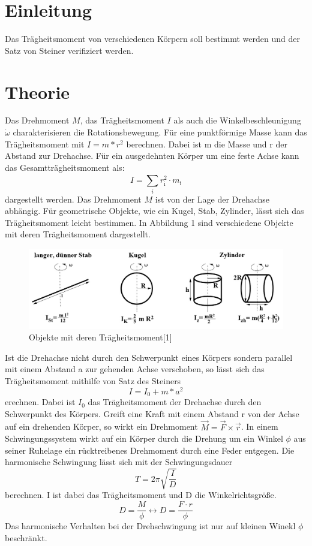 \section{Einleitung}
Das Trägheitsmoment von verschiedenen Körpern soll bestimmt werden und der Satz von Steiner verifiziert werden.
\section{Theorie}
Das Drehmoment $M$, das Trägheitsmoment $I$ als auch die Winkelbeschleunigung $\dot{\omega}$ charakterisieren die Rotationsbewegung.
Für eine punktförmige Masse kann das Trägheitsmoment mit $I = m*r^2$ berechnen. Dabei ist m die Masse und r der Abstand zur Drehachse.
Für ein ausgedehnten Körper um eine feste Achse kann das Gesamtträgheitsmoment als:
\begin{equation}
  I=\sum \limits_{i}^{} r_\text{i}^2 \cdot m_\text{i}
\end{equation}
dargestellt werden.
Das Drehmoment $M$ ist von der Lage der Drehachse abhängig.
Für geometrische Objekte, wie ein Kugel, Stab, Zylinder, lässt sich das Trägheitsmoment
leicht bestimmen.
In Abbildung 1 sind verschiedene Objekte mit deren Trägheitsmoment dargestellt.
\begin{figure}[H]
\centering
\includegraphics[width=\textwidth]{Bild1.jpg}
\caption{Objekte mit deren Trägheitsmoment[1]}
\label{fig:Abb1}
\end{figure}
Ist die Drehachse nicht durch den Schwerpunkt eines Körpers sondern parallel mit einem Abstand a
zur gehenden Achse verschoben, so lässt sich das Trägheitsmoment mithilfe von Satz des Steiners
\begin{equation}
  I = I_\text{0} + m*a^2
\end{equation}
erechnen. Dabei ist $I_\text{0}$ das Trägheitsmoment der Drehachse durch den Schwerpunkt des Körpers.
Greift eine Kraft mit einem Abstand r von der Achse auf ein drehenden Körper, so wirkt ein Drehmoment $\vec{M} = \vec{F} \times \vec{r}$.
In einem Schwingungssystem wirkt auf ein Körper durch die Drehung um ein Winkel $\phi$ aus seiner Ruhelage ein rücktreibenes Drehmoment
durch eine Feder entgegen. Die harmonische Schwingung lässt sich mit der Schwingungsdauer
\begin{equation}
  T = 2\pi \sqrt{\frac{I}{D}}
\end{equation}
berechnen. I ist dabei das Trägheitsmoment und D die Winkelrichtsgröße.
\begin{equation}
  D = \frac{M}{\phi} \leftrightarrow D = \frac{F \cdot r}{\phi}
\end{equation}
Das harmonische Verhalten bei der Drehschwingung ist nur auf kleinen Winekl $\phi$
beschränkt.
